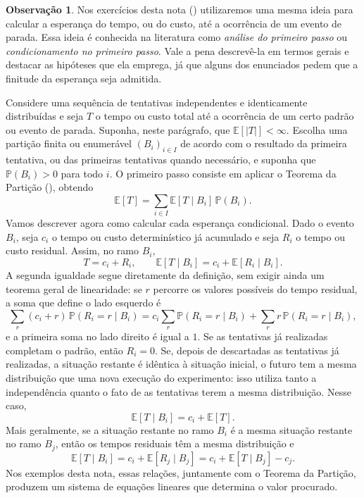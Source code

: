 \documentclass[12pt,portuguese]{article}
\theoremstyle{definition}
\newtheorem{remark}[remark]{Observação}
\begin{document}
\begin{remark}\label{rem:condicionamento-primeiro-passo}
Nos exercícios desta nota
()
utilizaremos uma mesma ideia para calcular a esperança do tempo, ou do custo,
até a ocorrência de um evento de parada. Essa ideia é conhecida na literatura
como \emph{análise do primeiro passo} ou \emph{condicionamento no primeiro
passo}. Vale a pena descrevê-la em termos gerais e destacar as hipóteses que
ela emprega, já que alguns dos enunciados pedem que a finitude da esperança
seja admitida.

Considere uma sequência de tentativas independentes e identicamente
distribuídas e seja \(T\) o tempo ou custo total até a ocorrência de um certo
padrão ou evento de parada. Suponha, neste parágrafo, que
\(\mathbb{E}[|T|]<\infty\). Escolha uma partição finita ou enumerável
\((B_i)_{i\in I}\) de acordo com o resultado da primeira tentativa, ou das
primeiras tentativas quando necessário, e suponha que \(\mathbb{P}(B_i)>0\)
para todo \(i\). O primeiro passo consiste em aplicar o Teorema da Partição
(), obtendo
\[
\mathbb{E}[T] = \sum_{i \in I} \mathbb{E}[T \mid B_i]\,\mathbb{P}(B_i).
\]
Vamos descrever agora como calcular cada esperança condicional. Dado o evento
\(B_i\), seja \(c_i\) o tempo ou custo determinístico já acumulado e seja
\(R_i\) o tempo ou custo residual. Assim, no ramo \(B_i\),
\[
T=c_i+R_i,
\qquad
\mathbb{E}[T\mid B_i]=c_i+\mathbb{E}[R_i\mid B_i].
\]
A segunda igualdade segue diretamente da definição, sem exigir ainda um
teorema geral de linearidade: se \(r\) percorre os valores possíveis do tempo
residual, a soma que define o lado esquerdo é
\[
\sum_r(c_i+r)\,\mathbb{P}(R_i=r\mid B_i)
=c_i\sum_r\mathbb{P}(R_i=r\mid B_i)
 +\sum_r r\,\mathbb{P}(R_i=r\mid B_i),
\]
e a primeira soma no lado direito é igual a \(1\).
Se as tentativas já realizadas completam o padrão, então \(R_i=0\). Se,
depois de descartadas as tentativas já realizadas, a situação restante é
idêntica à situação inicial, o futuro tem a mesma distribuição que uma nova
execução do experimento: isso utiliza tanto a independência quanto o fato de
as tentativas terem a mesma distribuição. Nesse caso,
\[
\mathbb{E}[T\mid B_i]=c_i+\mathbb{E}[T].
\]
Mais geralmente, se a situação restante no ramo \(B_i\) é a mesma situação
restante no ramo \(B_j\), então os tempos residuais têm a mesma distribuição e
\[
\mathbb{E}[T\mid B_i]
=c_i+\mathbb{E}[R_j\mid B_j]
=c_i+\mathbb{E}[T\mid B_j]-c_j.
\]
Nos exemplos desta nota, essas relações, juntamente com o Teorema da
Partição, produzem um sistema de equações lineares que determina o valor
procurado.


\end{remark}
\end{document}
